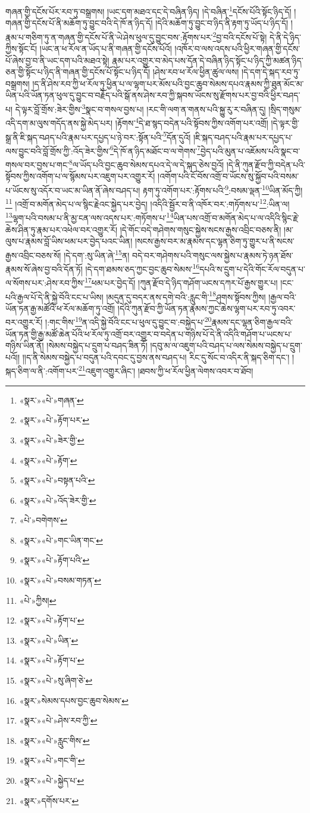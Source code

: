 གཞན་གྱི་དངོས་པོར་རབ་ཏུ་བསྒྲགས། །ཡང་དག་མཐའ་དང་དེ་བཞིན་ཉིད། །དེ་བཞིན་\footnote{«སྣར་»«པེ་»གཞན་}དངོས་པོའི་སྟོང་ཉིད་དོ། །གཞན་གྱི་དངོས་པོ་ནི་མཆོག་ཏུ་བྱུང་བའི་དེ་ཁོ་ན་ཉིད་དོ། །དེའི་མཆོག་ཏུ་བྱུང་བ་ཉིད་ནི་རྟག་ཏུ་ཡོད་པ་ཉིད་དོ། །རྣམ་པ་གཅིག་ཏུ་ན་གཞན་གྱི་དངོས་པོ་ནི་ཡེ་ཤེས་ཕུལ་དུ་བྱུང་བས་:རྟོགས་པར་\footnote{«སྣར་»«པེ་»རྟོག་པར་}བྱ་བའི་དངོས་པོ་སྟེ། དེ་ནི་དེ་ཉིད་ཀྱིས་སྟོང་ངོ། །ཡང་ན་ཕ་རོལ་ན་ཡོད་པ་ནི་གཞན་གྱི་དངོས་པོའོ། །འཁོར་བ་ལས་འདས་པའི་ཕྱིར་གཞན་གྱི་དངོས་པོ་ཞེས་བྱ་བ་ནི་ཡང་དག་པའི་མཐའ་སྟེ། རྣམ་པར་འགྱུར་བ་མེད་པས་དོན་དེ་བཞིན་ཉིད་སྟོང་པ་ཉིད་ཀྱི་མཚན་ཉིད་ཅན་གྱི་སྟོང་པ་ཉིད་ནི་གཞན་གྱི་དངོས་པོ་སྟོང་པ་ཉིད་དོ། །ཤེས་རབ་ཕ་རོལ་ཕྱིན་ཚུལ་ལས། །དེ་དག་དེ་སྐད་རབ་ཏུ་བསྒྲགས། །ད་ནི་ཤེས་རབ་ཀྱི་ཕ་རོལ་ཏུ་ཕྱིན་པ་ལ་ལྷག་པར་མོས་པའི་བྱང་ཆུབ་སེམས་དཔའ་རྣམས་ཀྱི་ཐུན་མོང་མ་ཡིན་པའི་ཡོན་ཏན་ཕུལ་དུ་བྱུང་བ་བརྗོད་པའི་སྒོ་ནས་ཤེས་རབ་ཀྱི་སྐབས་ཡོངས་སུ་རྫོགས་པར་བྱ་བའི་ཕྱིར་བཤད་པ། དེ་ལྟར་བློ་གྲོས་:ཟེར་གྱིས་\footnote{«སྣར་»«པེ་»ཟེར་གྱི་}སྣང་བ་གསལ་བྱས་པ། །རང་གི་ལག་ན་གནས་པའི་སྐྱུ་རུ་ར་བཞིན་དུ། །སྲིད་གསུམ་འདི་དག་མ་ལུས་གདོད་ནས་སྐྱེ་མེད་པར། །རྟོགས་\footnote{«སྣར་»«པེ་»རྟོག་}དེ་ཐ་སྙད་བདེན་པའི་སྟོབས་ཀྱིས་འགོག་པར་འགྲོ། །དེ་ལྟར་གྱི་སྒྲ་ནི་ཇི་སྐད་བཤད་པའི་རྣམ་པར་དཔྱད་པ་ཉེ་བར་:སྟོན་པའི་\footnote{«སྣར་»«པེ་»བསྟན་པའི་}དོན་དུའོ། །ཇི་སྐད་བཤད་པའི་རྣམ་པར་དཔྱད་པ་ལས་བྱུང་བའི་བློ་གྲོས་ཀྱི་:འོད་ཟེར་གྱིས་\footnote{«སྣར་»«པེ་»འོད་ཟེར་གྱི་}དེ་ཁོ་ན་ཉིད་མཐོང་བ་ལ་གེགས་\footnote{«པེ་»བགེགས་}བྱེད་པའི་མུན་པ་འཇོམས་པའི་སྣང་བ་གསལ་བར་བྱས་པ་གང་\footnote{«སྣར་»«པེ་»གང་ཡིན་གང་}ལ་ཡོད་པའི་བྱང་ཆུབ་སེམས་དཔའ་དེ་ལ་དེ་སྐད་ཅེས་བྱའོ། །དེ་ནི་ཀུན་རྫོབ་ཀྱི་བདེན་པའི་སྟོབས་ཀྱིས་འགོག་པ་ལ་སྙོམས་པར་འཇུག་པར་འགྱུར་རོ། །འགོག་པའི་ངོ་བོས་འགྲོ་བ་ཡོངས་སུ་སྐྱོབ་པའི་བསམ་པ་ཡོངས་སུ་འདོར་བ་ཡང་མ་ཡིན་ནོ་ཞེས་བཤད་པ། རྟག་ཏུ་འགོག་པར་:རྟོགས་པའི་\footnote{«སྣར་»«པེ་»རྟོག་པའི་}:བསམ་ལྡན་\footnote{«སྣར་»«པེ་»བསམ་གཏན་}ཡིན་མོད་ཀྱི།\footnote{«པེ་»ཀྱིས།} །འགྲོ་བ་མགོན་མེད་པ་ལ་སྙིང་རྗེའང་སྐྱེད་པར་བྱེད། །འདིའི་སྦྱོར་བ་ནི་འཁོར་བར་:གཏོགས་པ་\footnote{«སྣར་»«པེ་»རྟོག་པ་}:ཡིན་ལ། \footnote{«སྣར་»«པེ་»ཡིན་}ལྷག་པའི་བསམ་པ་ནི་མྱ་ངན་ལས་འདས་པར་:གཏོགས་པ་\footnote{«སྣར་»«པེ་»རྟོག་པ་}ཡིན་པས་འགྲོ་བ་མགོན་མེད་པ་ལ་འདིའི་སྙིང་རྗེ་ཆེས་ཤིན་ཏུ་རྣམ་པར་འཕེལ་བར་འགྱུར་རོ། །དེ་གོང་བདེ་གཤེགས་གསུང་སྐྱེས་སངས་རྒྱས་འབྲིང་བཅས་ནི། །མ་ལུས་པ་རྣམས་བློ་ཡིས་ཕམ་པར་བྱེད་པའང་ཡིན། །སངས་རྒྱས་བར་མ་རྣམས་དང་ལྷན་ཅིག་ཏུ་གྱུར་པ་ནི་སངས་རྒྱས་འབྲིང་བཅས་སོ། །དེ་དག་:སུ་ཡིན་ཞེ་\footnote{«སྣར་»«པེ་»སུ་ཞིག་ཅེ་}ན། བདེ་བར་གཤེགས་པའི་གསུང་ལས་སྐྱེས་པ་རྣམས་ཏེ་ཉན་ཐོས་རྣམས་སོ་ཞེས་བྱ་བའི་དོན་ཏོ། །དེ་དག་ཐམས་ཅད་ཀྱང་བྱང་ཆུབ་སེམས་\footnote{«སྣར་»སེམས་དཔས་བྱང་ཆུབ་སེམས་}དཔའི་ས་དྲུག་པ་དེའི་གོང་རོལ་བདུན་པ་ལ་སོགས་པར་:ཤེས་རབ་ཀྱིས་\footnote{«སྣར་»«པེ་»ཤེས་རབ་ཀྱི་}ཕམ་པར་བྱེད་དོ། །ཀུན་རྫོབ་དེ་ཉིད་གཤོག་ཡངས་དཀར་པོ་རྒྱས་གྱུར་པ། །ངང་པའི་རྒྱལ་པོ་དེ་ནི་སྐྱེ་བོའི་ངང་པ་ཡིས། །མདུན་དུ་བདར་ནས་དགེ་བའི་:རླུང་གི་\footnote{«སྣར་»«པེ་»རླུང་གིས་}ཤུགས་སྟོབས་ཀྱིས། །རྒྱལ་བའི་ཡོན་ཏན་རྒྱ་མཚོའི་ཕ་རོལ་མཆོག་ཏུ་འགྲོ། །དེའི་ཀུན་རྫོབ་ཀྱི་ཡོན་ཏན་རྣམས་ཀྱང་ཆེས་ལྷག་པར་རབ་ཏུ་འབར་བར་འགྱུར་རོ། །:གང་གིས་\footnote{«སྣར་»«པེ་»གང་གི་}ན་འདི་སྐྱེ་བོའི་ངང་པ་ཕུལ་དུ་བྱུང་བ་:བསྐྱེད་པ་\footnote{«སྣར་»«པེ་»སྐྱེད་པ་}རྣམས་དང་ལྷན་ཅིག་རྒྱལ་བའི་ཡོན་ཏན་གྱི་རྒྱ་མཚོ་ཆེན་པོའི་ཕ་རོལ་ཏུ་འགྲོ་བར་འགྱུར་བ་བདེན་པ་གཉིས་པོ་དེ་ནི་འདིའི་གཤོག་པ་ཡངས་པ་གཉིས་ཡིན་ནོ། །སེམས་བསྐྱེད་པ་དྲུག་པ་བཤད་ཟིན་ཏོ། །དབུ་མ་ལ་འཇུག་པའི་བཤད་པ་ལས་སེམས་བསྐྱེད་པ་དྲུག་པའོ།། །།ད་ནི་སེམས་བསྐྱེད་པ་བདུན་པའི་དབང་དུ་བྱས་ནས་བཤད་པ། རིང་དུ་སོང་བ་འདིར་ནི་སྐད་ཅིག་དང་། །སྐད་ཅིག་ལ་ནི་:འགོག་པར་\footnote{«སྣར་»དགོས་པར་}འཇུག་འགྱུར་ཞིང་། །ཐབས་ཀྱི་ཕ་རོལ་ཕྱིན་ལེགས་འབར་བ་ཐོབ། 